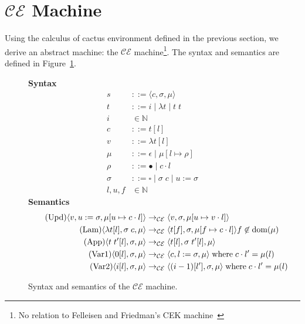\section{$\mathcal{CE}$ Machine} \label{sec:mach}

Using the calculus of cactus environment defined in the previous section, we
derive an abstract machine: the $\mathcal{CE}$ machine\footnote{No relation to
Felleisen and Friedman's CEK machine~\cite{felleisen1986control}}. The syntax
and semantics are defined in Figure~\ref{fig:CEM}. 

\begin{figure}
\textbf{Syntax}
\begin{align*}
\tag{State} s &::= \langle c, \sigma, \mu \rangle \\
\tag{Term} t &::= i \; | \; \lambda t \; | \; t \; t  \\
\tag{Variable} i &\in \mathbb{N}  \\
\tag{Closure} c &::= t [l] \\
\tag{Value} v &::= \lambda t[l] \\
\tag{Heap} \mu &::= \epsilon \; | \; \mu [ l \mapsto \rho ] \\
\tag{Environment} \rho &::= \bullet \; | \; c \cdot l \\
\tag{Context} \sigma &::= \square \; | \; \sigma \; c \;  | \; u:=\sigma \\
\tag{Location} l,u,f &\in \mathbb{N}
\end{align*}
\textbf{Semantics}
\begin{align*}
\tag{Upd}
\langle v, u := \sigma, \mu[u \mapsto c \cdot l] \rangle 
  &\rightarrow_{\mathcal{CE}}
\langle v, \sigma, \mu[u \mapsto v \cdot l] \rangle  \\
\tag{Lam}
\langle \lambda t[l], \sigma \; c, \mu \rangle 
  &\rightarrow_{\mathcal{CE}}
\langle t[f], \sigma, \mu[f \mapsto c \cdot l]\rangle f \not \in \textnormal{dom}(\mu)  \\
\tag{App}
\langle t \; t'[l], \sigma, \mu \rangle
  &\rightarrow_{\mathcal{CE}}
\langle t[l], \sigma \; t'[l], \mu \rangle \\
\tag{Var1}
\langle 0[l], \sigma, \mu \rangle
  &\rightarrow_{\mathcal{CE}}
\langle c, l := \sigma, \mu \rangle 
\; \textnormal{where} \; c \cdot l' = \mu(l)\\
\tag{Var2}
\langle i[l], \sigma, \mu \rangle
  &\rightarrow_{\mathcal{CE}}
\langle (i-1)[l'], \sigma, \mu \rangle
\; \textnormal{where} \; c \cdot l' = \mu(l)
\end{align*}
\caption{Syntax and semantics of the $\mathcal{CE}$ machine.}
\label{fig:CEM}
\end{figure}

